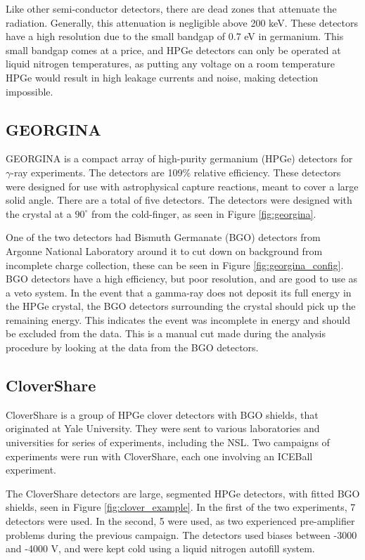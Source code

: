 Like other semi-conductor detectors, there are dead zones that attenuate the radiation. Generally, this attenuation is negligible above 200 keV. These detectors have a high resolution due to the small bandgap of 0.7 eV in germanium. This small bandgap comes at a price, and HPGe detectors can only be operated at liquid nitrogen temperatures, as putting any voltage on a room temperature HPGe would result in high leakage currents and noise, making detection impossible.

\subsection{GEORGINA}

GEORGINA is a compact array of high-purity germanium (HPGe) detectors for $\gamma$-ray experiments\citep{isnap18:_georgina}. The detectors are 109\% relative efficiency. These detectors were designed for use with astrophysical capture reactions, meant to cover a large solid angle. There are a total of five detectors. The detectors were designed with the crystal at a $90^{\circ}$ from the cold-finger, as seen in Figure \ref{fig:georgina}.



One of the two detectors had Bismuth Germanate (BGO) detectors from Argonne National Laboratory around it to cut down on background from incomplete charge collection, these can be seen in Figure \ref{fig:georgina_config}. BGO detectors have a high efficiency, but poor resolution, and are good to use as a veto system. In the event that a gamma-ray does not deposit its full energy in the HPGe crystal, the BGO detectors surrounding the crystal should pick up the remaining energy. This indicates the event was incomplete in energy and should be excluded from the data. This is a manual cut made during the analysis procedure by looking at the data from the BGO detectors.

\subsection{CloverShare}

CloverShare is a group of HPGe clover detectors with BGO shields, that originated at Yale University. They were sent to various laboratories and universities for series of experiments, including the NSL. Two campaigns of experiments were run with CloverShare, each one involving an ICEBall experiment.

The CloverShare detectors are large, segmented HPGe detectors, with fitted BGO shields, seen in Figure \ref{fig:clover_example}. In the first of the two experiments, 7 detectors were used. In the second, 5 were used, as two experienced pre-amplifier problems during the previous campaign. The detectors used biases between -3000 and -4000 V, and were kept cold using a liquid nitrogen autofill system.

